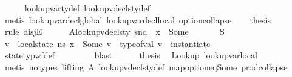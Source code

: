 \begin{isabellebody}
\ \ \ \ \isamarkupfalse%
\ lookup{\isacharunderscore}{\kern0pt}var{\isacharunderscore}{\kern0pt}ty{\isacharunderscore}{\kern0pt}def\ lookup{\isacharunderscore}{\kern0pt}vdecls{\isacharunderscore}{\kern0pt}ty{\isacharunderscore}{\kern0pt}def\isanewline
\ \ \ \ \isamarkupfalse%
\ {\isacharparenleft}{\kern0pt}metis\ lookup{\isacharunderscore}{\kern0pt}var{\isacharunderscore}{\kern0pt}decl{\isacharunderscore}{\kern0pt}global{\isacharunderscore}{\kern0pt}{}\ lookup{\isacharunderscore}{\kern0pt}var{\isacharunderscore}{\kern0pt}decl{\isacharunderscore}{\kern0pt}local\ option{\isachardot}{\kern0pt}collapse{\isacharparenright}{\kern0pt}\isanewline
\ \ \isamarkupfalse%
\ {\isacharquery}{\kern0pt}thesis\isanewline
\ \ \isamarkupfalse%
\ {\isacharparenleft}{\kern0pt}rule\ disjE{\isacharparenright}{\kern0pt}\isanewline
\ \ \ \ \isamarkupfalse%
\ A{}{\isacharcolon}{\kern0pt}{\isachardoublequoteopen}lookup{\isacharunderscore}{\kern0pt}vdecls{\isacharunderscore}{\kern0pt}ty\ {\isacharparenleft}{\kern0pt}snd\ {\isasymLambda}{\isacharparenright}{\kern0pt}\ x\ {\isacharequal}{\kern0pt}\ Some\ {\isasymtau}{\isachardoublequoteclose}\isanewline
\ \ \ \ \isamarkupfalse%
\ S{}\ \isamarkupfalse%
\ v\ \ {\isachardoublequoteopen}{\isacharparenleft}{\kern0pt}local{\isacharunderscore}{\kern0pt}state\ ns{\isacharparenright}{\kern0pt}\ x\ {\isacharequal}{\kern0pt}\ Some\ v{\isachardoublequoteclose}\ \ {\isachardoublequoteopen}type{\isacharunderscore}{\kern0pt}of{\isacharunderscore}{\kern0pt}val\ v\ {\isacharequal}{\kern0pt}\ instantiate\ {\isasymOmega}\ {\isasymtau}{\isachardoublequoteclose}\ \ \ \ \ \ \isanewline
\ \ \ \ \ \ \isamarkupfalse%
\ state{\isacharunderscore}{\kern0pt}typ{\isacharunderscore}{\kern0pt}wf{\isacharunderscore}{\kern0pt}def\ \isanewline
\ \ \ \ \ \ \isamarkupfalse%
\ blast\isanewline
\ \ \ \ \isamarkupfalse%
\ {\isacharquery}{\kern0pt}thesis\ \isamarkupfalse%
\ Lookup\ lookup{\isacharunderscore}{\kern0pt}var{\isacharunderscore}{\kern0pt}local\isanewline
\ \ \ \ \ \ \isamarkupfalse%
\ {\isacharparenleft}{\kern0pt}metis\ {\isacharparenleft}{\kern0pt}no{\isacharunderscore}{\kern0pt}types{\isacharcomma}{\kern0pt}\ lifting{\isacharparenright}{\kern0pt}\ A{}\ lookup{\isacharunderscore}{\kern0pt}vdecls{\isacharunderscore}{\kern0pt}ty{\isacharunderscore}{\kern0pt}def\ map{\isacharunderscore}{\kern0pt}option{\isacharunderscore}{\kern0pt}eq{\isacharunderscore}{\kern0pt}Some\ prod{\isachardot}{\kern0pt}collapse{\isacharparenright}{\kern0pt}\ \isanewline

\end{isabellebody}
